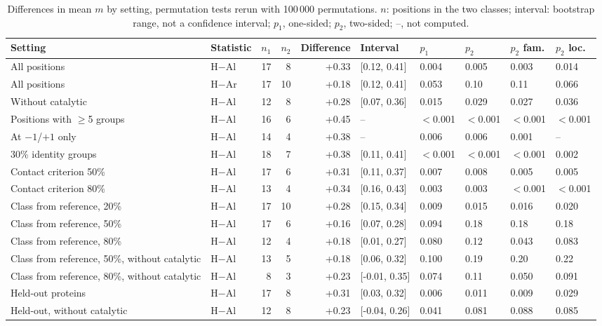 \documentclass[preprint,12pt]{elsarticle}
\begin{document}
\begin{table}[h]
\centering\scriptsize\setlength{\tabcolsep}{2.5pt}
\caption{Differences in mean $m$ by setting, permutation tests rerun with 100\,000 permutations. $n$: positions in the two classes; interval: bootstrap range, not a confidence interval; $p_1$, one-sided; $p_2$, two-sided; --, not computed.}
\label{tab:variants}
\begin{tabular}{p{3.5cm}lrrrlllll}
\toprule
Setting & Statistic & $n_1$ & $n_2$ & Difference & Interval & $p_1$ & $p_2$ & $p_2$ fam. & $p_2$ loc.\\
\midrule
All positions & H$-$Al & 17 & 8 & +0.33 & [0.12, 0.41] & 0.004 & 0.005 & 0.003 & 0.014\\
All positions & H$-$Ar & 17 & 10 & +0.18 & [0.12, 0.41] & 0.053 & 0.10 & 0.11 & 0.066\\
Without catalytic & H$-$Al & 12 & 8 & +0.28 & [0.07, 0.36] & 0.015 & 0.029 & 0.027 & 0.036\\
Positions with $\ge$5 groups & H$-$Al & 16 & 6 & +0.45 & -- & $<$0.001 & $<$0.001 & $<$0.001 & $<$0.001\\
At $-1$/$+1$ only & H$-$Al & 14 & 4 & +0.38 & -- & 0.006 & 0.006 & 0.001 & --\\
30\% identity groups & H$-$Al & 18 & 7 & +0.38 & [0.11, 0.41] & $<$0.001 & $<$0.001 & $<$0.001 & 0.002\\
Contact criterion 50\% & H$-$Al & 17 & 6 & +0.31 & [0.11, 0.37] & 0.007 & 0.008 & 0.005 & 0.005\\
Contact criterion 80\% & H$-$Al & 13 & 4 & +0.34 & [0.16, 0.43] & 0.003 & 0.003 & $<$0.001 & $<$0.001\\
Class from reference, 20\% & H$-$Al & 17 & 10 & +0.28 & [0.15, 0.34] & 0.009 & 0.015 & 0.016 & 0.020\\
Class from reference, 50\% & H$-$Al & 17 & 6 & +0.16 & [0.07, 0.28] & 0.094 & 0.18 & 0.18 & 0.18\\
Class from reference, 80\% & H$-$Al & 12 & 4 & +0.18 & [0.01, 0.27] & 0.080 & 0.12 & 0.043 & 0.083\\
Class from reference, 50\%, without catalytic & H$-$Al & 13 & 5 & +0.18 & [0.06, 0.32] & 0.100 & 0.19 & 0.20 & 0.22\\
Class from reference, 80\%, without catalytic & H$-$Al & 8 & 3 & +0.23 & [-0.01, 0.35] & 0.074 & 0.11 & 0.050 & 0.091\\
Held-out proteins & H$-$Al & 17 & 8 & +0.31 & [0.03, 0.32] & 0.006 & 0.011 & 0.009 & 0.029\\
Held-out, without catalytic & H$-$Al & 12 & 8 & +0.23 & [-0.04, 0.26] & 0.041 & 0.081 & 0.088 & 0.085\\

\end{tabular}
\end{table}
\end{document}

